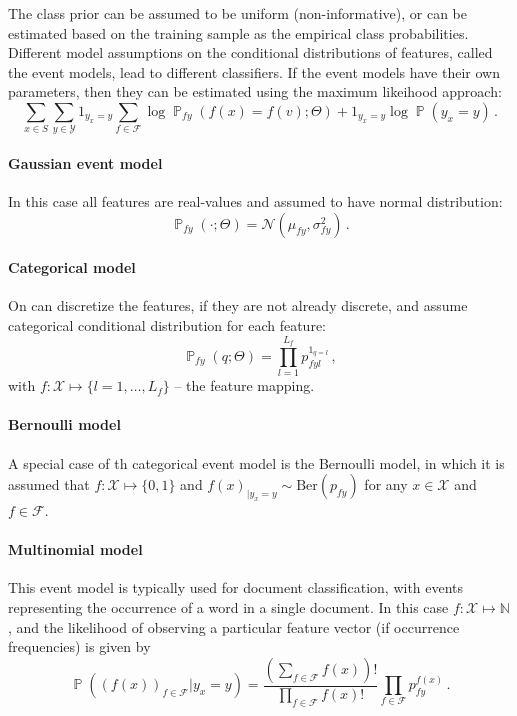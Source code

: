 \documentclass[a4paper,14pt]{extarticle}
\newcommand{\Fcal}{\mathcal{F}}
\newcommand{\Ncal}{\mathcal{N}}
\newcommand{\Xcal}{\mathcal{X}}
\newcommand{\Ycal}{\mathcal{Y}}
\newcommand{\pr}{\mathop{\mathbb{P}}\nolimits}
\begin{document}
The class prior can be assumed to be uniform (non-informative), or can be estimated
based on the training sample as the empirical class probabilities. Different model
assumptions on the conditional distributions of features, called the event models,
lead to different classifiers. If the event models have their own parameters, then
they can be estimated using the maximum likeihood approach:
$$ \sum_{x\in S} \sum_{y\in \Ycal}
    1_{y_x=y} \sum_{f\in \Fcal} \log \pr_{fy}(f(x) = f(v); \Theta)
    + 1_{y_x=y} \log \pr(y_x = y)
    \,. $$

\paragraph{Gaussian event model} %
\label{par:gaussian_event_model}
In this case all features are real-values and assumed to have normal distribution:
$$ \pr_{fy}(\cdot; \Theta) = \Ncal(\mu_{fy}, \sigma^2_{fy})\,. $$

\paragraph{Categorical model} %
\label{par:categorical_model}

On can discretize the features, if they are not already discrete, and assume categorical
conditional distribution for each feature:
$$ \pr_{fy}(q; \Theta) = \prod_{l=1}^{L_f} p_{fyl}^{1_{q=l}} \,,$$
with $f:\Xcal\mapsto \{l=1,\ldots, L_f\}$ -- the feature mapping.


\paragraph{Bernoulli model} %
\label{par:bernoulli_model}

A special case of th categorical event model is the Bernoulli model, in which it
is assumed that $f:\Xcal\mapsto\{0,1\}$ and $f(x)_{|y_x=y}\sim \text{Ber}(p_{fy})$
for any $x\in \Xcal$ and $f\in \Fcal$.


\paragraph{Multinomial model} %
\label{par:multinomial_model}

This event model is typically used for document classification, with events representing
the occurrence of a word in a single document. In this case $f:\Xcal\mapsto \mathbb{N}$,
and the likelihood of observing a particular feature vector (if occurrence frequencies)
is given by
$$ \pr((f(x))_{f\in \Fcal}| y_x=y)
    = \frac{(\sum_{f\in \Fcal} f(x))!}{\prod_{f\in \Fcal} f(x)!}
        \prod_{f\in \Fcal} p_{fy}^{f(x)} \,. $$
\end{document}
